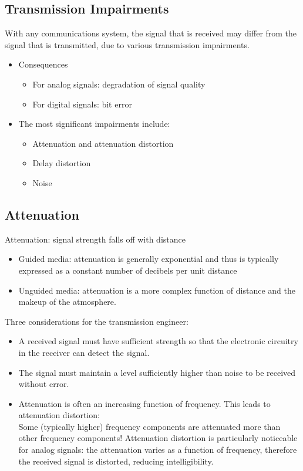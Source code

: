 \documentclass[11pt]{article}
\begin{document}
\subsection{Transmission Impairments}
With any communications system, the signal that is received may differ from the signal that is transmitted, due to various transmission impairments. \\
\begin{itemize}
    \item Consequences
    \begin{itemize}
        \item For analog signals: degradation of signal quality
        \item For digital signals: bit error
    \end{itemize}
    \item The most significant impairments include:
    \begin{itemize}
        \item Attenuation and attenuation distortion
        \item Delay distortion
        \item Noise
    \end{itemize}
\end{itemize}
\subsection{Attenuation}
Attenuation: signal strength falls off with distance \\
\begin{itemize}
    \item Guided media: attenuation is generally exponential and thus is typically expressed as a constant number of decibels per unit distance
    \item Unguided media: attenuation is a more complex function of distance and the makeup of the atmosphere.
\end{itemize}
Three considerations for the transmission engineer:
\begin{itemize}
    \item A received signal must have sufficient strength so that the electronic circuitry in the receiver can detect the signal.
    \item The signal must maintain a level sufficiently higher than noise to be received without error.
    \item Attenuation is often an increasing function of frequency. This leads to attenuation distortion: \\
    Some (typically higher) frequency components are attenuated more than other frequency components!
    Attenuation distortion is particularly noticeable for analog signals: the attenuation varies as a function of frequency, therefore the received signal is distorted, reducing intelligibility.
\end{itemize}
\end{document}
